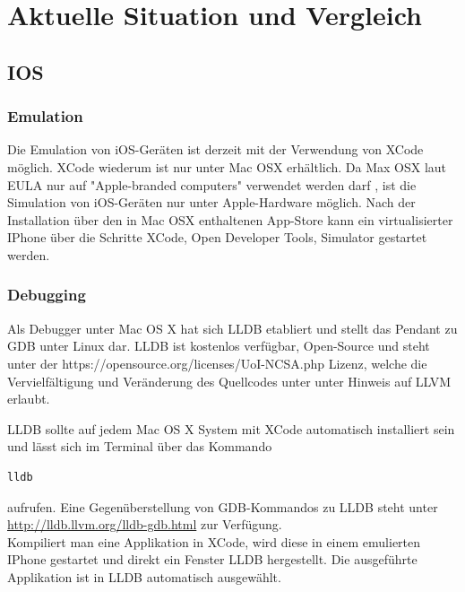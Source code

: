 \section{Aktuelle Situation und Vergleich}
		\subsection{IOS}
			\subsubsection{Emulation}
			Die Emulation von iOS-Geräten ist derzeit mit der Verwendung von XCode möglich. XCode wiederum ist nur unter Mac OSX erhältlich. Da Max OSX laut EULA nur auf "Apple-branded computers" verwendet werden darf \cite{AppleEULA}, ist die Simulation von iOS-Geräten nur unter Apple-Hardware möglich. Nach der Installation über den in Mac OSX enthaltenen App-Store kann ein virtualisierter IPhone über die Schritte XCode, Open Developer Tools, Simulator gestartet werden.
		\subsubsection{Debugging}
Als Debugger unter Mac OS X hat sich LLDB etabliert und stellt das Pendant zu GDB unter Linux dar. LLDB ist kostenlos verfügbar, Open-Source und steht unter der https://opensource.org/licenses/UoI-NCSA.php Lizenz, welche die Vervielfältigung und Veränderung des Quellcodes unter unter Hinweis auf LLVM erlaubt.

LLDB sollte auf jedem Mac OS X System mit XCode automatisch installiert sein und lässt sich im Terminal über das Kommando
\begin{lstlisting}
lldb
\end{lstlisting} aufrufen. Eine Gegenüberstellung von GDB-Kommandos zu LLDB steht unter \url{http://lldb.llvm.org/lldb-gdb.html} zur Verfügung.
\\
 Kompiliert man eine Applikation in XCode, wird diese in einem emulierten IPhone gestartet und direkt ein Fenster LLDB hergestellt. Die ausgeführte Applikation ist in LLDB automatisch ausgewählt.

